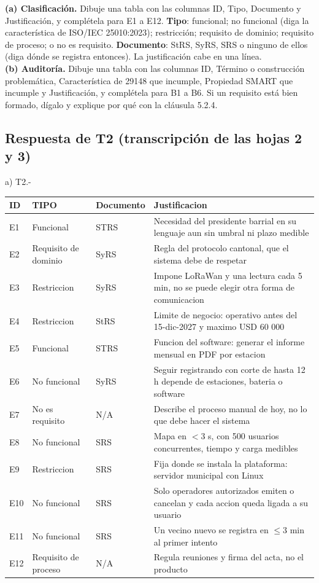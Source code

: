 \documentclass[11pt]{article}
\newcommand{\subseccion}[1]{\subsection{\textcolor{midblue}{#1}}}
\begin{document}
\begin{cajatarea}[title={T2. Clasificación y auditoría \hfill D2 · 30\,\%}]
	\textbf{(a) Clasificación.} Dibuje una tabla con las columnas ID, Tipo, Documento y Justificación, y complétela para E1 a E12. \textbf{Tipo}: funcional; no funcional (diga la característica de ISO/IEC 25010:2023); restricción; requisito de dominio; requisito de proceso; o no es requisito. \textbf{Documento}: StRS, SyRS, SRS o ninguno de ellos (diga dónde se registra entonces). La justificación cabe en una línea.\\[4pt]
	\textbf{(b) Auditoría.} Dibuje una tabla con las columnas ID, Término o construcción problemática, Característica de 29148 que incumple, Propiedad SMART que incumple y Justificación, y complétela para B1 a B6. Si un requisito está bien formado, dígalo y explique por qué con la cláusula 5.2.4.
\end{cajatarea}

\subseccion{Respuesta de T2 (transcripción de las hojas 2 y 3)}

a) T2.-

{\small
\begin{longtable}{|L{1.0cm}|L{3.4cm}|L{1.9cm}|L{8.8cm}|}
	\hline
	ID & TIPO & Documento & Justificacion \\ \hline
	\endhead
	E1 & Funcional & STRS & Necesidad del presidente barrial en su lenguaje aun sin umbral ni plazo medible \\ \hline
	E2 & Requisito de dominio & SyRS & Regla del protocolo cantonal, que el sistema debe de respetar \\ \hline
	E3 & Restriccion & SyRS & Impone LoRaWan y una lectura cada 5 min, no se puede elegir otra forma de comunicacion \\ \hline
	E4 & Restriccion & StRS & Limite de negocio: operativo antes del 15-dic-2027 y maximo USD 60 000 \\ \hline
	E5 & Funcional & STRS & Funcion del software: generar el informe mensual en PDF por estacion \\ \hline
	E6 & No funcional & SyRS & Seguir registrando con corte de hasta 12 h depende de estaciones, bateria o software \\ \hline
	E7 & No es requisito & N/A & Describe el proceso manual de hoy, no lo que debe hacer el sistema \\ \hline
	E8 & No funcional & SRS & Mapa en $<$3 s, con 500 usuarios concurrentes, tiempo y carga medibles \\ \hline
	E9 & Restriccion & SRS & Fija donde se instala la plataforma: servidor municipal con Linux \\ \hline
	E10 & No funcional & SRS & Solo operadores autorizados emiten o cancelan y cada accion queda ligada a su usuario \\ \hline
	E11 & No funcional & SRS & Un vecino nuevo se registra en $\leq$3 min al primer intento \\ \hline
	E12 & Requisito de proceso & N/A & Regula reuniones y firma del acta, no el producto \\ \hline
\end{longtable}
}
\end{document}
